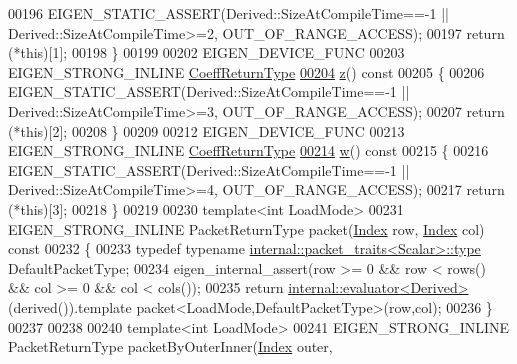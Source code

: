 \begin{DoxyCode}
00196       EIGEN\_STATIC\_ASSERT(Derived::SizeAtCompileTime==-1 || Derived::SizeAtCompileTime>=2, 
      OUT\_OF\_RANGE\_ACCESS);
00197       \textcolor{keywordflow}{return} (*\textcolor{keyword}{this})[1];
00198     \}
00199 
00202     EIGEN\_DEVICE\_FUNC
00203     EIGEN\_STRONG\_INLINE \hyperlink{class_eigen_1_1internal_1_1_tensor_lazy_evaluator_writable}{CoeffReturnType}
\hyperlink{group___core___module_a9040af2dcad8961168daafe09c1b1dc4}{00204}     \hyperlink{group___core___module_a9040af2dcad8961168daafe09c1b1dc4}{z}()\textcolor{keyword}{ const}
00205 \textcolor{keyword}{    }\{
00206       EIGEN\_STATIC\_ASSERT(Derived::SizeAtCompileTime==-1 || Derived::SizeAtCompileTime>=3, 
      OUT\_OF\_RANGE\_ACCESS);
00207       \textcolor{keywordflow}{return} (*\textcolor{keyword}{this})[2];
00208     \}
00209 
00212     EIGEN\_DEVICE\_FUNC
00213     EIGEN\_STRONG\_INLINE \hyperlink{class_eigen_1_1internal_1_1_tensor_lazy_evaluator_writable}{CoeffReturnType}
\hyperlink{group___core___module_a422892fbb6b2eecce243776c3b8452ab}{00214}     \hyperlink{group___core___module_a422892fbb6b2eecce243776c3b8452ab}{w}()\textcolor{keyword}{ const}
00215 \textcolor{keyword}{    }\{
00216       EIGEN\_STATIC\_ASSERT(Derived::SizeAtCompileTime==-1 || Derived::SizeAtCompileTime>=4, 
      OUT\_OF\_RANGE\_ACCESS);
00217       \textcolor{keywordflow}{return} (*\textcolor{keyword}{this})[3];
00218     \}
00219 
00230     \textcolor{keyword}{template}<\textcolor{keywordtype}{int} LoadMode>
00231     EIGEN\_STRONG\_INLINE PacketReturnType packet(\hyperlink{group___core___module_a554f30542cc2316add4b1ea0a492ff02}{Index} row, \hyperlink{group___core___module_a554f30542cc2316add4b1ea0a492ff02}{Index} col)\textcolor{keyword}{ const}
00232 \textcolor{keyword}{    }\{
00233       \textcolor{keyword}{typedef} \textcolor{keyword}{typename} \hyperlink{group___sparse_core___module}{internal::packet\_traits<Scalar>::type} 
      DefaultPacketType;
00234       eigen\_internal\_assert(row >= 0 && row < rows() && col >= 0 && col < cols());
00235       \textcolor{keywordflow}{return} \hyperlink{struct_eigen_1_1internal_1_1evaluator}{internal::evaluator<Derived>}(derived()).\textcolor{keyword}{template} 
      packet<LoadMode,DefaultPacketType>(row,col);
00236     \}
00237 
00238 
00240     \textcolor{keyword}{template}<\textcolor{keywordtype}{int} LoadMode>
00241     EIGEN\_STRONG\_INLINE PacketReturnType packetByOuterInner(\hyperlink{group___core___module_a554f30542cc2316add4b1ea0a492ff02}{Index} outer, 

\end{DoxyCode}
